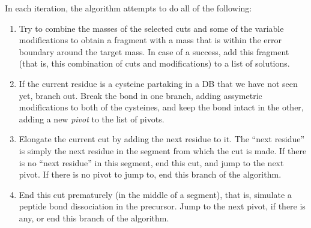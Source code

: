 In each iteration, the algorithm attempts to do all of the following:

\begin{enumerate}
	\item Try to combine the masses of the selected cuts and some of the variable modifications to obtain a fragment with a mass that is within the error boundary around the target mass. In case of a success, add this fragment (that is, this combination of cuts and modifications) to a list of solutions.
	\item If the current residue is a cysteine partaking in a DB that we have not seen yet, branch out. Break the bond in one branch, adding assymetric modifications to both of the cysteines, and keep the bond intact in the other, adding a new \emph{pivot} to the list of pivots.
	\item Elongate the current cut by adding the next residue to it. The ``next residue'' is simply the next residue in the segment from which the cut is made. If there is no ``next residue'' in this segment, end this cut, and jump to the next pivot. If there is no pivot to jump to, end this branch of the algorithm.
	\item End this cut prematurely (in the middle of a segment), that is, simulate a peptide bond dissociation in the precursor. Jump to the next pivot, if there is any, or end this branch of the algorithm.
\end{enumerate}


